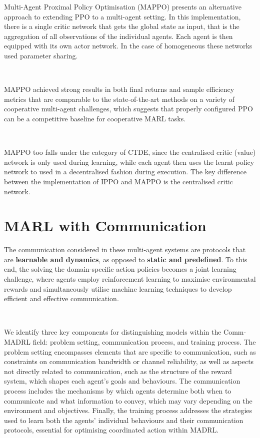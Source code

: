 \documentclass{article}
\begin{document}
Multi-Agent Proximal Policy Optimisation (MAPPO) \citep{chao2021surprising} presents an alternative approach to extending PPO to a multi-agent setting. In this implementation, there is a single critic network that gets the global state as input, that is the aggregation of all observations of the individual agents. Each agent is then equipped with its own actor network. In the case of homogeneous these networks used parameter sharing.

\

MAPPO achieved strong results in both final returns and sample efficiency metrics that are comparable to the state-of-the-art methods on a variety of cooperative multi-agent challenges, which suggests that properly configured PPO can be a competitive baseline for cooperative MARL tasks. \citep{chao2021surprising}

\

MAPPO too falls under the category of CTDE, since the centralised critic (value) network is only used during learning, while each agent then uses the learnt policy network to used in a decentralised fashion during execution. The key difference between the implementation of IPPO and MAPPO is the centralised critic network.

\section{MARL with Communication}


The communication considered in these multi-agent systems are protocols that are \textbf{learnable and dynamics}, as opposed to \textbf{static and predefined}. To this end, the solving the domain-specific action policies becomes a joint learning challenge, where agents employ reinforcement learning to maximise environmental rewards and simultaneously utilise machine learning techniques to develop efficient and effective communication. \citep{zhu2024survey}

\

We identify three key components for distinguishing models within the Comm-MADRL field: problem setting, communication process, and training process. The problem setting encompasses elements that are specific to communication, such as constraints on communication bandwidth or channel reliability, as well as aspects not directly related to communication, such as the structure of the reward system, which shapes each agent's goals and behaviours. The communication process includes the mechanisms by which agents determine both when to communicate and what information to convey, which may vary depending on the environment and objectives. Finally, the training process addresses the strategies used to learn both the agents' individual behaviours and their communication protocols, essential for optimising coordinated action within MADRL.
\end{document}

